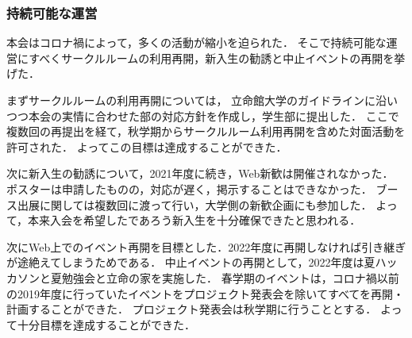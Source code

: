 \subsubsection*{持続可能な運営}
本会はコロナ禍によって，多くの活動が縮小を迫られた．
そこで持続可能な運営にすべくサークルルームの利用再開，新入生の勧誘と中止イベントの再開を挙げた．

まずサークルルームの利用再開については，
立命館大学のガイドラインに沿いつつ本会の実情に合わせた部の対応方針を作成し，学生部に提出した．
ここで複数回の再提出を経て，秋学期からサークルルーム利用再開を含めた対面活動を許可された．
よってこの目標は達成することができた．

次に新入生の勧誘について，2021年度に続き，Web新歓は開催されなかった．
ポスターは申請したものの，対応が遅く，掲示することはできなかった．
ブース出展に関しては複数回に渡って行い，大学側の新歓企画にも参加した．
よって，本来入会を希望したであろう新入生を十分確保できたと思われる．

次にWeb上でのイベント再開を目標とした．2022年度に再開しなければ引き継ぎが途絶えてしまうためである．
中止イベントの再開として，2022年度は夏ハッカソンと夏勉強会と立命の家を実施した．
春学期のイベントは，コロナ禍以前の2019年度に行っていたイベントをプロジェクト発表会を除いてすべてを再開・計画することができた．
プロジェクト発表会は秋学期に行うこととする．
よって十分目標を達成することができた．
